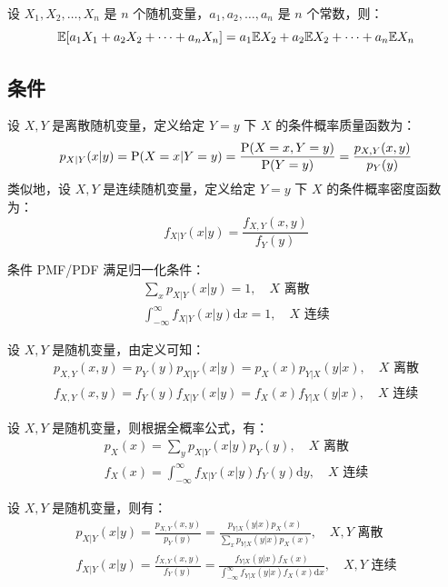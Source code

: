 \begin{theorem}[随机变量的多元线性函数的期望]
设 $X_1,X_2,\ldots,X_n$ 是 $n$ 个随机变量，$a_1,a_2,\ldots,a_n$ 是 $n$ 个常数，则：
\[
\mathbb{E}[a_1X_1+a_2X_2+\cdots+a_nX_n]=a_1\mathbb{E} X_2+a_2\mathbb{E} X_2+\cdots+a_n\mathbb{E} X_n
\]
\end{theorem}


\subsection{条件}

\begin{definition}[条件分布]
设 $X,Y$ 是离散随机变量，定义给定 $Y=y$ 下 $X$ 的条件概率质量函数为：
\[
p_{X\vert Y}(x\vert y)=\mathrm{P}(X=x\vert Y=y)=\frac{\mathrm{P}(X=x,Y=y)}{\mathrm{P}(Y=y)}=\frac{p_{X,Y}(x,y)}{p_Y(y)}
\]
类似地，设 $X,Y$ 是连续随机变量，定义给定 $Y=y$ 下 $X$ 的条件概率密度函数为：
\[
f_{X\vert Y}(x\vert y)=\frac{f_{X,Y}(x,y)}{f_Y(y)}
\]
\end{definition}

\begin{property}
条件 PMF/PDF 满足归一化条件：
\begin{gather*}
\sum_x p_{X\vert Y}(x\vert y)=1,\quad\text{$X$ 离散}\\
\int_{-\infty}^{\infty}f_{X\vert Y}(x\vert y)\mathrm dx=1,\quad\text{$X$ 连续}
\end{gather*}
\end{property}

\begin{theorem}[条件分布与联合分布]
设 $X,Y$ 是随机变量，由定义可知：
\begin{gather*}
p_{X,Y}(x,y)=p_Y(y)p_{X\vert Y}(x\vert y)=p_X(x)p_{Y\vert X}(y\vert x),\quad\text{$X$ 离散}\\
f_{X,Y}(x,y)=f_Y(y)f_{X\vert Y}(x\vert y)=f_X(x)f_{Y\vert X}(y\vert x),\quad\text{$X$ 连续}
\end{gather*}
\end{theorem}

\begin{theorem}[条件分布与边缘分布]
设 $X,Y$ 是随机变量，则根据全概率公式，有：
\begin{gather*}
p_X(x)=\sum_y p_{X\vert Y}(x\vert y)p_Y(y),\quad\text{$X$ 离散}\\
f_X(x)=\int_{-\infty}^{\infty} f_{X\vert Y}(x\vert y)f_Y(y)\mathrm dy,\quad\text{$X$ 连续}
\end{gather*}
\end{theorem}

\begin{theorem}[贝叶斯公式]
设 $X,Y$ 是随机变量，则有：
\begin{gather*}
p_{X\vert Y}(x\vert y)=\frac{p_{X,Y}(x,y)}{p_Y(y)}=\frac{p_{Y\vert X}(y\vert x)p_X(x)}{\sum_x p_{Y\vert X}(y\vert x)p_X(x)},\quad\text{$X,Y$ 离散}\\
f_{X\vert Y}(x\vert y)=\frac{f_{X,Y}(x,y)}{f_Y(y)}=\frac{f_{Y\vert X}(y\vert x)f_X(x)}{\int_{-\infty}^{\infty}f_{Y\vert X}(y\vert x)f_X(x)\mathrm dx},\quad\text{$X,Y$ 连续}
\end{gather*}
\end{theorem}

